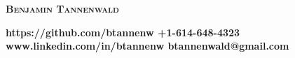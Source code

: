 \documentclass[line]{letter}
\begin{document}
\sffamily
{ \begin{center}\huge \textsc{\textbf{Benjamin Tannenwald}} \end{center}}%
{\bf \normalsize https://github.com/btannenw \hfill +1-614-648-4323\\} 
{\bf \normalsize www.linkedin.com/in/btannenw \hfill btannenwald@gmail.com\vspace*{-.15in}}

\noindent{\rule{\textwidth}{1.5pt}}

\end{document}
